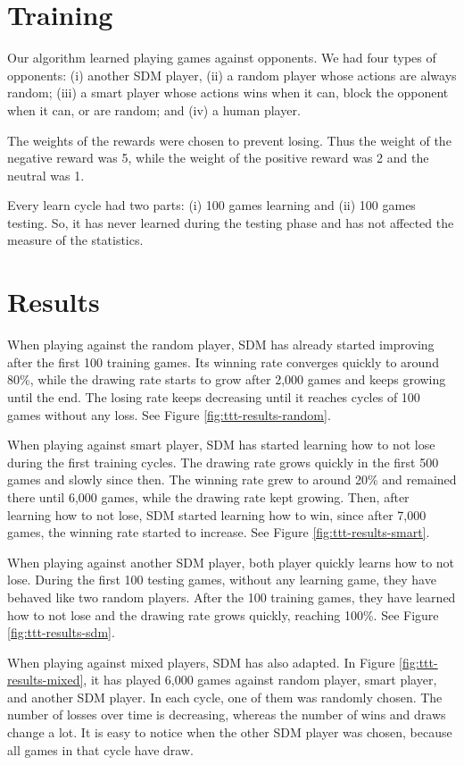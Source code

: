\section{Training}

Our algorithm learned playing games against opponents. We had four types of opponents: (i) another SDM player, (ii) a random player whose actions are always random; (iii) a smart player whose actions wins when it can, block the opponent when it can, or are random; and (iv) a human player.

The weights of the rewards were chosen to prevent losing. Thus the weight of the negative reward was 5, while the weight of the positive reward was 2 and the neutral was 1.

Every learn cycle had two parts: (i) 100 games learning and (ii) 100 games testing. So, it has never learned during the testing phase and has not affected the measure of the statistics.


\section{Results}

When playing against the random player, SDM has already started improving after the first 100 training games. Its winning rate converges quickly to around 80\%, while the drawing rate starts to grow after 2,000 games and keeps growing until the end. The losing rate keeps decreasing until it reaches cycles of 100 games without any loss. See Figure \ref{fig:ttt-results-random}.

When playing against smart player, SDM has started learning how to not lose during the first training cycles. The drawing rate grows quickly in the first 500 games and slowly since then. The winning rate grew to around 20\% and remained there until 6,000 games, while the drawing rate kept growing. Then, after learning how to not lose, SDM started learning how to win, since after 7,000 games, the winning rate started to increase. See Figure \ref{fig:ttt-results-smart}.

When playing against another SDM player, both player quickly learns how to not lose. During the first 100 testing games, without any learning game, they have behaved like two random players. After the 100 training games, they have learned how to not lose and the drawing rate grows quickly, reaching 100\%. See Figure \ref{fig:ttt-results-sdm}.

When playing against mixed players, SDM has also adapted. In Figure \ref{fig:ttt-results-mixed}, it has played 6,000 games against random player, smart player, and another SDM player. In each cycle, one of them was randomly chosen. The number of losses over time is decreasing, whereas the number of wins and draws change a lot. It is easy to notice when the other SDM player was chosen, because all games in that cycle have draw.

